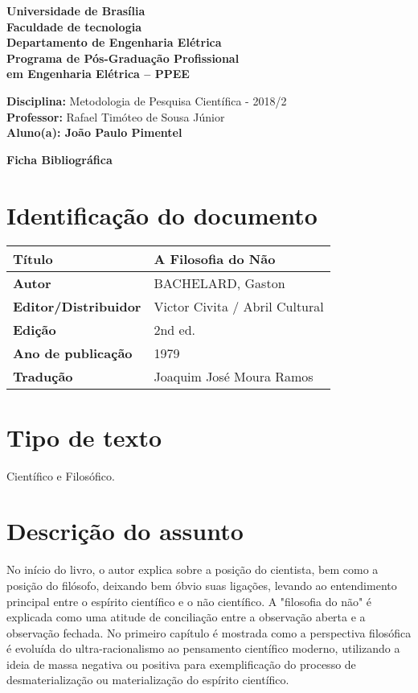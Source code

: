 \documentclass[11pt]{article}
\begin{document}
\noindent
\begin{center}
\Large\textbf{Universidade de Brasília}\\
\Large\textbf{Faculdade de tecnologia}\\
\Large\textbf{Departamento de Engenharia Elétrica}\\
\Large\textbf{Programa de Pós-Graduação Profissional \\
	em Engenharia Elétrica -- PPEE}\\
\end{center}

\large{
\noindent
\textbf{Disciplina:} Metodologia de Pesquisa Científica - 2018/2\\
\textbf{Professor:} Rafael Timóteo de Sousa Júnior \\
\textbf{Aluno(a): João Paulo Pimentel}}\\

\begin{center}
\Large\textbf{Ficha Bibliográfica}
\end{center}
\normalsize

\section{Identificação do documento}
\begin{center}
	\begin{tabular}{|l|l|} \hline
		\textbf{Título} & A Filosofia do Não\cite{Bachelard1979} \\ \hline
		\textbf{Autor} & BACHELARD, Gaston \\ \hline
		\textbf{Editor/Distribuidor} & Victor Civita / Abril Cultural
 \\ \hline
		\textbf{Edição} & 2nd ed. \\ \hline
		\textbf{Ano de publicação} & 1979 \\ \hline
		\textbf{Tradução} &  Joaquim José Moura Ramos \\ \hline
	\end{tabular}
\end{center}

\section{Tipo de texto}
    Científico e Filosófico.

\section{Descrição do assunto}
    No início do livro, o autor explica sobre a posição do cientista, bem como a posição do filósofo, deixando bem óbvio suas ligações, levando ao entendimento principal entre o espírito científico e o não científico. A "filosofia do não" é explicada como uma atitude de conciliação entre a observação aberta e a observação fechada. No primeiro capítulo é mostrada como a perspectiva filosófica é evoluída do ultra-racionalismo ao pensamento científico moderno, utilizando a ideia de massa negativa ou positiva para exemplificação do processo de desmaterialização ou materialização do espírito científico.
\end{document}
